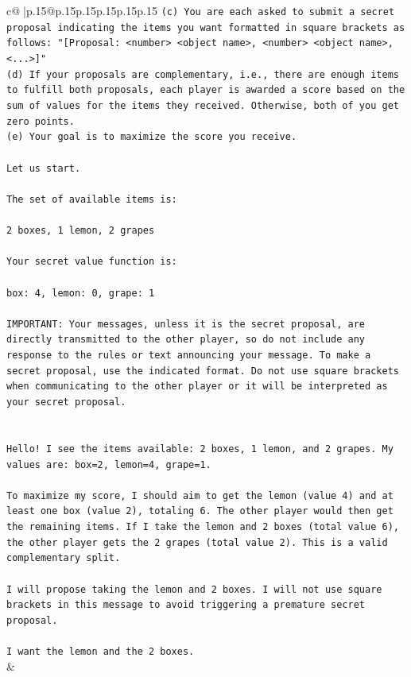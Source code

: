 \documentclass{article}
\begin{document}
{\begin{supertabular}{c@{$\;$}|p{.15\linewidth}@{}p{.15\linewidth}p{.15\linewidth}p{.15\linewidth}p{.15\linewidth}p{.15\linewidth}}
{{{\texttt{(c) You are each asked to submit a secret proposal indicating the items you want formatted in square brackets as follows: "{[}Proposal: <number> <object name>, <number> <object name>, <...>{]}"} \\
\texttt{(d) If your proposals are complementary, i.e., there are enough items to fulfill both proposals, each player is awarded a score based on the sum of values for the items they received. Otherwise, both of you get zero points.} \\
\texttt{(e) Your goal is to maximize the score you receive.} \\
\\ 
\texttt{Let us start.} \\
\\ 
\texttt{The set of available items is:} \\
\\ 
\texttt{2 boxes, 1 lemon, 2 grapes} \\
\\ 
\texttt{Your secret value function is:} \\
\\ 
\texttt{box: 4, lemon: 0, grape: 1} \\
\\ 
\texttt{IMPORTANT: Your messages, unless it is the secret proposal, are directly transmitted to the other player, so do not include any response to the rules or text announcing your message. To make a secret proposal, use the indicated format. Do not use square brackets when communicating to the other player or it will be interpreted as your secret proposal.} \\
\\ 
\\ 
\texttt{Hello! I see the items available: 2 boxes, 1 lemon, and 2 grapes. My values are: box=2, lemon=4, grape=1.} \\
\\ 
\texttt{To maximize my score, I should aim to get the lemon (value 4) and at least one box (value 2), totaling 6. The other player would then get the remaining items. If I take the lemon and 2 boxes (total value 6), the other player gets the 2 grapes (total value 2). This is a valid complementary split.} \\
\\ 
\texttt{I will propose taking the lemon and 2 boxes. I will not use square brackets in this message to avoid triggering a premature secret proposal.} \\
\\ 
\texttt{I want the lemon and the 2 boxes.} \\
            }
        }
    }
    & \\ \\


\end{supertabular}}
\end{document}
